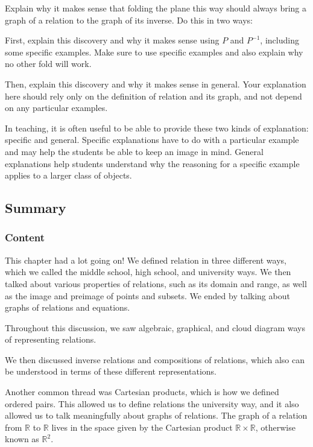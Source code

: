 \documentclass[11pt]{article}
\newenvironment{task}
	{\begin{mdframed}[linecolor=lightgray, linewidth=3pt]\raggedright}
	{\end{mdframed}}
\newcommand{\R}{\mathbb{R}}
\theoremstyle{definition}
\begin{document}
\begin{task}
Explain why it makes sense that folding the plane this way should always bring a graph of a relation to the graph of its inverse. Do this in two ways:
	\begin{itemize*}
	\item First, explain this discovery and why it makes sense using $P$ and $P^{-1}$, including some specific examples. Make sure to use specific examples and also explain why no other fold will work.
	\item Then, explain this discovery and why it makes sense in general. Your explanation here should rely only on the definition of relation and its graph, and not depend on any particular examples. 
	\end{itemize*}
\end{task}

In teaching, it is often useful to be able to provide these two kinds of explanation: specific and general. Specific explanations have to do with a particular example and may help the students be able to keep an image in mind. General explanations help students understand why the reasoning for a specific example applies to a larger class of objects.

\subsection{Summary}

\subsubsection*{Content}
This chapter had a lot going on! We defined relation in three different ways, which we called the middle school, high school, and university ways. We then talked about various properties of relations, such as its domain and range, as well as the image and preimage of points and subsets. We ended by talking about graphs of relations and equations.

Throughout this discussion, we saw algebraic, graphical, and cloud diagram ways of representing relations. 

We then discussed inverse relations and compositions of relations, which also can be understood in terms of these different representations. 
 
 Another common thread was Cartesian products, which is how we defined ordered pairs.  This allowed us to define relations the university way, and it also allowed us to talk meaningfully about graphs of relations.  The graph of a relation from $\R$ to $\R$ lives in the space given by the Cartesian product $\R\times \R$, otherwise known as $\R^2$. 
 
\end{document}
